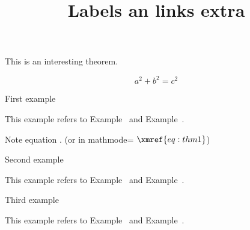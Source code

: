 \documentclass{ximera}
\title{Labels an links extra}
\begin{document}
\begin{abstract}
\end{abstract}
\maketitle
\label{xim:problemNumbersBase}


 \begin{theorem} \label{thm:1}
  
  This is an interesting  theorem.  

  \begin{equation}
    \label{eq:thm1}
    a^2 + b^2 = c^2
  \end{equation}
  
 \end{theorem}

\begin{example} \label{ex:1}
 First example  

 This example refers to Example~ and Example~.

 Note equation . (or in mathmode= $\xmref{eq:thm1}$)
\end{example}

\begin{example} \label{ex:2}
 Second example  

  This example refers to Example~ and Example~.
\end{example}

\begin{example} \label{ex:3}
 Third example  

  This example refers to Example~ and Example~.
\end{example}

\lipsum
\lipsum
\lipsum
\lipsum
\end{document}
